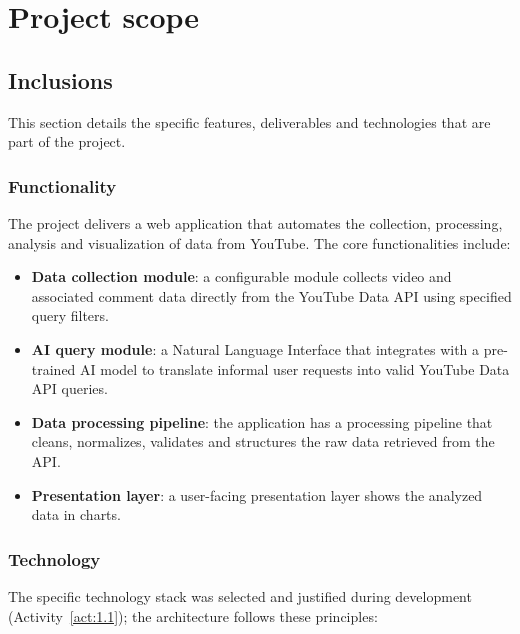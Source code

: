 \chapter{Project scope}
\label{chap:project_scope}

\section{Inclusions}

This section details the specific features, deliverables and technologies that are part of the project.

\subsection{Functionality}

The project delivers a web application that automates the collection, processing, analysis and visualization of data from YouTube. The core functionalities include:

\begin{itemize}
    \item \textbf{Data collection module}: a configurable module collects video and associated comment data directly from the YouTube Data API using specified query filters.

    \item \textbf{AI query module}: a Natural Language Interface that integrates with a pre-trained AI model to translate informal user requests into valid YouTube Data API queries.

    \item \textbf{Data processing pipeline}: the application has a processing pipeline that cleans, normalizes, validates and structures the raw data retrieved from the API.

    \item \textbf{Presentation layer}: a user-facing presentation layer shows the analyzed data in charts.
\end{itemize}

\subsection{Technology}

The specific technology stack was selected and justified during development (Activity~\ref{act:1.1}); the architecture follows these principles:

